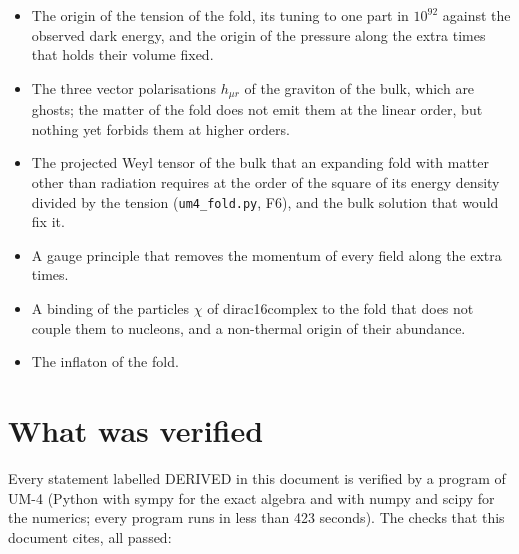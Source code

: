 \documentclass[
  10pt,
]{article}
\providecommand{\tightlist}{%
  \setlength{\itemsep}{0pt}\setlength{\parskip}{0pt}}
\begin{document}
\begin{itemize}
\tightlist
\item
  The origin of the tension of the fold, its tuning to one part in
  \(10^{92}\) against the observed dark energy, and the origin of the
  pressure along the extra times that holds their volume fixed.
\item
  The three vector polarisations \(h_{\mu r}\) of the graviton of the
  bulk, which are ghosts; the matter of the fold does not emit them at
  the linear order, but nothing yet forbids them at higher orders.
\item
  The projected Weyl tensor of the bulk that an expanding fold with
  matter other than radiation requires at the order of the square of its
  energy density divided by the tension (\texttt{um4\_fold.py}, F6), and
  the bulk solution that would fix it.
\item
  A gauge principle that removes the momentum of every field along the
  extra times.
\item
  A binding of the particles \(\chi\) of dirac16complex to the fold that
  does not couple them to nucleons, and a non-thermal origin of their
  abundance.
\item
  The inflaton of the fold.
\end{itemize}

\hypertarget{what-was-verified}{%
\section{What was verified}\label{what-was-verified}}

Every statement labelled DERIVED in this document is verified by a
program of UM-4 (Python with sympy for the exact algebra and with numpy
and scipy for the numerics; every program runs in less than 423
seconds). The checks that this document cites, all passed:
\end{document}
